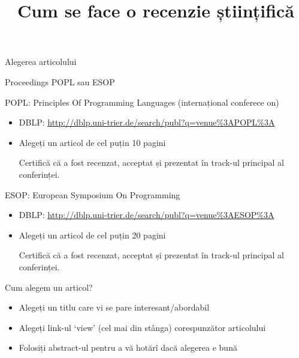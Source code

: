 \documentclass[xcolor=pdftex,romanian,colorlinks,handout]{beamer}
\title[SLP---Recenzii]{Cum se face o recenzie științifică}
\begin{document}
\begin{frame}
  \titlepage
\end{frame}


\begin{section}{Alegerea articolului}

\begin{frame}{Proceedings POPL sau ESOP}

\begin{block}{POPL: Principles Of Programming Languages (internațional conferece on)}
\begin{itemize}
\item DBLP: \href{http://dblp.uni-trier.de/search/publ?q=venue\%3APOPL\%3A}{http://dblp.uni-trier.de/search/publ?q=venue\%3APOPL\%3A}
\item Alegeți un articol de cel puțin 10 pagini 

Certifică că a fost recenzat, acceptat și prezentat în track-ul principal al conferinței.

\end{itemize}
\end{block}


\begin{block}{ESOP: European Symposium On Programming}
\begin{itemize}
\item DBLP: \href{http://dblp.uni-trier.de/search/publ?q=venue\%3AESOP\%3A}{http://dblp.uni-trier.de/search/publ?q=venue\%3AESOP\%3A}

\item Alegeți un articol de cel puțin 20 pagini 

Certifică că a fost recenzat, acceptat și prezentat în track-ul principal al conferinței.
\end{itemize}
\end{block}
\end{frame}

\begin{frame}{Cum alegem un articol?}
\begin{itemize}
\item Alegeți un titlu care vi se pare interesant/abordabil
\item Alegeți link-ul `view' (cel mai din stânga) corespunzător articolului  
\item Folosiți abstract-ul pentru a vă hotărî dacă alegerea e bună
\end{itemize}
\end{frame}


\end{section}
\end{document}

